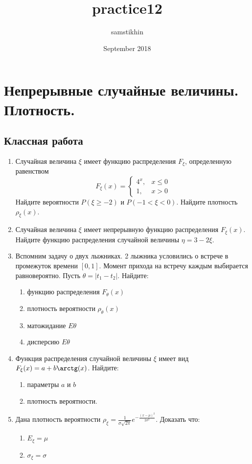 \documentclass[a4paper, 14pt]{extarticle}
\title{practice12}
\author{samstikhin}
\date{September 2018}
\begin{document}
\section*{Непрерывные случайные величины. Плотность.}
\subsection*{Классная работа}
\begin{enumerate}
\item Случайная величина $\xi$ имеет функцию распределения $F_{\xi}$, определенную равенством
$$F_\xi(x) =\left\{
	\begin{array}{cc}
	4^{x}, & x\leq 0 \\
	1, & x>0
	\end{array}\right.$$
Найдите вероятности 
$P(\xi \geq -2)$ и $P(-1 < \xi < 0)$. Найдите плотность $\rho_{\xi}(x)$.
\item Случайная величина $\xi$ имеет непрерывную функцию распределения $F_{\xi}(x)$. 
Найдите функцию распределения случайной величины $\eta=3-2\xi$.
\item Вспомним задачу о двух лыжниках. 2 лыжника условились о встрече в промежуток времени $[0,1]$.
    Момент прихода на встречу каждым выбирается равновероятно. 
    Пусть $\theta = |t_1 - t_2|$. Найдите:
    \begin{enumerate}
    \item функцию распределения $F_{\theta}(x)$
    \item плотность вероятности $\rho_{\theta}(x)$
    \item матожидание $E\theta$
    \item дисперсию $E\theta$
    \end{enumerate}
\item Функция распределения случайной величины $\xi$ имеет вид $F_{\xi}(x)=a + b\arctg(x)$. 
Найдите:
\begin{enumerate}
\item параметры $a$ и $b$
\item плотность вероятности.
\end{enumerate} 

\item Дана плотность вероятности $\rho_{\xi} = \frac{1}{\sigma \sqrt{2\pi}} e^{-\frac{(x-\mu)^2}{2\sigma^2}}$.
Доказать что:
\begin{enumerate}
\item $E_{\xi}= \mu$
\item $\sigma_{\xi}= \sigma$

\end{enumerate} 



\newpage

\end{enumerate}
\end{document}
